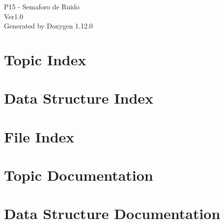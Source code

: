\documentclass[twoside]{book}
\newcommand{\+}{\discretionary{\mbox{\scriptsize$\hookleftarrow$}}{}{}}
\newcommand{\clearemptydoublepage}{%
    \newpage{\pagestyle{empty}\cleardoublepage}%
  }
\begin{document}
  \raggedbottom
    \hypersetup{pageanchor=false,
                bookmarksnumbered=true,
                pdfencoding=unicode
               }
  \begin{titlepage}
  \vspace*{7cm}
  \begin{center}%
  {\Large P15 -\/ Semaforo de Ruido}\\
  [1ex]\large Ver1.\+0 \\
  \vspace*{1cm}
  {\large Generated by Doxygen 1.12.0}\\
  \end{center}
  \end{titlepage}
  \clearemptydoublepage
  \tableofcontents
  \clearemptydoublepage
  \hypersetup{pageanchor=true}
\chapter{Topic Index}

\chapter{Data Structure Index}

\chapter{File Index}

\chapter{Topic Documentation}



\chapter{Data Structure Documentation}






\end{document}
